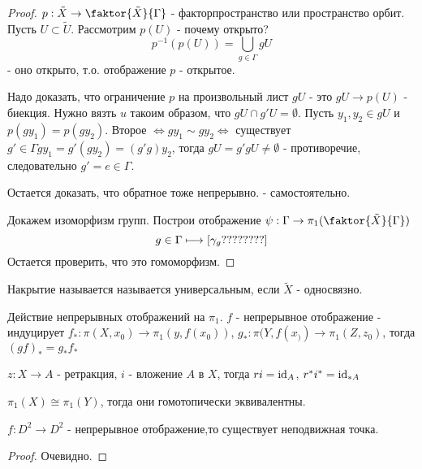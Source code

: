 \begin{proof}
    $p: \tilde{X} \rightarrow \faktor{\tilde{X}}{\Gamma}$ - факторпространство или пространство орбит. Пусть $U \subset \tilde{U}$. Рассмотрим $p(U)$ - почему открыто?
    \[
        p^{-1}(p(U)) = \bigcup_{g \in \Gamma} gU
    \]
    - оно открыто, т.о. отображение $p$ - открытое.

    Надо доказать, что ограничение $p$ на произвольный лист $gU$ - это $gU \rightarrow p(U)$ - биекция.
    Нужно вязть $u$ такоим образом, что $gU \cap g'U = \emptyset$. Пусть $y_1, y_2 \in gU$ и $p(g y_1) = p(g y_2)$. Второе $\Leftrightarrow g y_1 \sim g y_2 \Leftrightarrow$ существует $g' \in \Gamma g y_1 = g' (g y_2) = (g' g) y_2$, тогда $gU = g'gU \neq \emptyset$ - противоречие, следовательно $g' = e \in \Gamma$.

    Остается доказать, что обратное тоже непрерывно. - самостоятельно.

    Докажем изоморфизм групп. Построи отображение $\psi: \Gamma \rightarrow \pi_1 (\faktor{\tilde{X}}{\Gamma})$
    \[
        g \in \Gamma \longmapsto \left[\gamma_g ????????\right] 
    \]
    Остается проверить, что это гомоморфизм.
\end{proof}

\begin{definition}
    Накрытие называется называется универсальным, если $\tilde{X}$ - односвязно.
\end{definition}

Действие непрерывных отображений на $\pi_1$. 
$f$ - непрерывное отображение - индуцирует $f_* :\pi(X, x_0) \rightarrow \pi_1(y, f(x_0))$, $g_* : \pi(Y, f(x_)) \rightarrow \pi_1(Z, z_0)$, тогда $(gf)_* = g_* f_*$

\begin{exercise}
    $z: X \rightarrow A$ - ретракция, $i$ - вложение $A$ в $X$, тогда $r i = \mathrm{id}_A$, $r^* i^* = \mathrm{id}_{*A}$
\end{exercise}

\begin{exercise}
    $\pi_1(X) \cong \pi_1(Y)$, тогда они гомотопически эквивалентны.
\end{exercise}

\begin{theorem}[Брауэр]
    $f: D^2 \rightarrow D^2$ - непрерывное отображение,то существует неподвижная точка.
\end{theorem}

\begin{proof}
    Очевидно.
\end{proof}